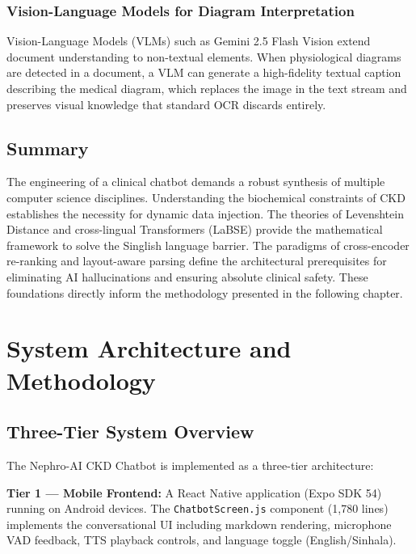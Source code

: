 \documentclass[12pt,a4paper]{report}
\begin{document}
\subsection{Vision-Language Models for Diagram Interpretation}

Vision-Language Models (VLMs) such as Gemini 2.5 Flash Vision extend document understanding to non-textual elements. When physiological diagrams are detected in a document, a VLM can generate a high-fidelity textual caption describing the medical diagram, which replaces the image in the text stream and preserves visual knowledge that standard OCR discards entirely.

\section{Summary}

The engineering of a clinical chatbot demands a robust synthesis of multiple computer science disciplines. Understanding the biochemical constraints of CKD establishes the necessity for dynamic data injection. The theories of Levenshtein Distance and cross-lingual Transformers (LaBSE) provide the mathematical framework to solve the Singlish language barrier. The paradigms of cross-encoder re-ranking and layout-aware parsing define the architectural prerequisites for eliminating AI hallucinations and ensuring absolute clinical safety. These foundations directly inform the methodology presented in the following chapter.

\chapter{System Architecture and Methodology}
\label{chap:methodology}

\section{Three-Tier System Overview}

The Nephro-AI CKD Chatbot is implemented as a three-tier architecture:

\textbf{Tier 1 --- Mobile Frontend:} A React Native application (Expo SDK 54) running on Android devices. The \texttt{ChatbotScreen.js} component (1,780 lines) implements the conversational UI including markdown rendering, microphone VAD feedback, TTS playback controls, and language toggle (English/Sinhala).
\end{document}
